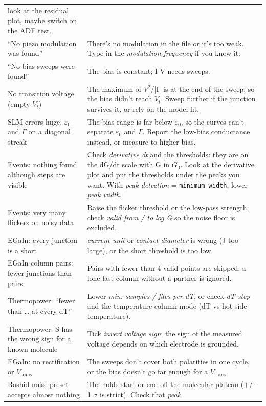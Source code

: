 \documentclass[
  11pt,
  a4paper,
]{article}
\begin{document}
\begin{longtable}[]{@{}
  >{\raggedright\arraybackslash}p{}
  >{\raggedright\arraybackslash}p{}@{}}
look at the residual plot, maybe switch on the ADF test. \\
``No piezo modulation was found'' & There's no modulation in the file or
it's too weak. Type in the \emph{modulation frequency} if you know
it. \\
``No bias sweeps were found'' & The bias is constant; I-V needs
sweeps. \\
No transition voltage (empty $V_t$) & The maximum of $V^{2}$/|I| is at
the end of the sweep, so the bias didn't reach $V_t$. Sweep further if
the junction survives it, or rely on the model fit. \\
SLM errors huge, $\varepsilon_0$ and $\Gamma$ on a diagonal streak & The
bias range is far below $\varepsilon_0$, so the curves can't separate
$\varepsilon_0$ and $\Gamma$. Report the low-bias conductance instead,
or measure to higher bias. \\
Events: nothing found although steps are visible & Check
\emph{derivative dt} and the thresholds: they are on the dG/dt scale
with G in $G_0$. Look at the derivative plot and put the thresholds
under the peaks you want. With \emph{peak detection} =
\texttt{minimum width}, lower \emph{peak width}. \\
Events: very many flickers on noisy data & Raise the flicker threshold
or the low-pass strength; check \emph{valid from / to log G} so the
noise floor is excluded. \\
EGaIn: every junction is a short & \emph{current unit} or \emph{contact
diameter} is wrong (J too large), or the short threshold is too low. \\
EGaIn column pairs: fewer junctions than pairs & Pairs with fewer than 4
valid points are skipped; a lone last column without a partner is
ignored. \\
Thermopower: ``fewer than \ldots{} at every dT'' & Lower \emph{min.
samples / files per dT}, or check \emph{dT step} and the temperature
column mode (dT vs hot-side temperature). \\
Thermopower: S has the wrong sign for a known molecule & Tick
\emph{invert voltage sign}; the sign of the measured voltage depends on
which electrode is grounded. \\
EGaIn: no rectification or $V_\mathrm{trans}$ & The sweeps don't cover
both polarities in one cycle, or the bias doesn't go far enough for a
$V_\mathrm{trans}$. \\
Rashid noise preset accepts almost nothing & The holds start or end off
the molecular plateau (+/- 1 $\sigma$ is strict). Check that \emph{peak
}
\end{longtable}
\end{document}
